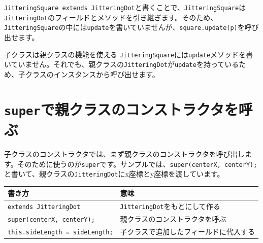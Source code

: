 \begin{listing}[htbp]
\inputminted[firstline=27,lastline=43]{ts}{typescript-p5/listings/chapter14/jittering-square-inheritance.ts}
\caption{\texttt{JitteringDot}を継承する\texttt{JitteringSquare}（\texttt{chapter14/jittering-square-inheritance.ts}）}
\label{lst:chapter14-jittering-square-inheritance-child}
\end{listing}

\begin{listing}[htbp]
\inputminted[firstline=45,lastline=61]{ts}{typescript-p5/listings/chapter14/jittering-square-inheritance.ts}
\caption{継承したクラスを使うスケッチ（\texttt{chapter14/jittering-square-inheritance.ts}）}
\label{lst:chapter14-jittering-square-inheritance-sketch}
\end{listing}

\texttt{JitteringSquare extends JitteringDot}と書くことで、\texttt{JitteringSquare}は\texttt{JitteringDot}のフィールドとメソッドを引き継ぎます。そのため、\texttt{JitteringSquare}の中には\texttt{update}を書いていませんが、\texttt{square.update(p)}を呼び出せます。

\begin{pointbox}{子クラスは親クラスの機能を使える}
\texttt{JitteringSquare}には\texttt{update}メソッドを書いていません。それでも、親クラスの\texttt{JitteringDot}が\texttt{update}を持っているため、子クラスのインスタンスから呼び出せます。
\end{pointbox}

\section{\texttt{super}で親クラスのコンストラクタを呼ぶ}

子クラスのコンストラクタでは、まず親クラスのコンストラクタを呼び出します。そのために使うのが\texttt{super}です。サンプルでは、\texttt{super(centerX, centerY);}と書いて、親クラスの\texttt{JitteringDot}にx座標とy座標を渡しています。

\begin{center}
\begin{tabular}{ll}
\toprule
書き方 & 意味 \\
\midrule
\texttt{extends JitteringDot} & \texttt{JitteringDot}をもとにして作る \\
\texttt{super(centerX, centerY);} & 親クラスのコンストラクタを呼ぶ \\
\texttt{this.sideLength = sideLength;} & 子クラスで追加したフィールドに代入する \\
\bottomrule
\end{tabular}
\end{center}

